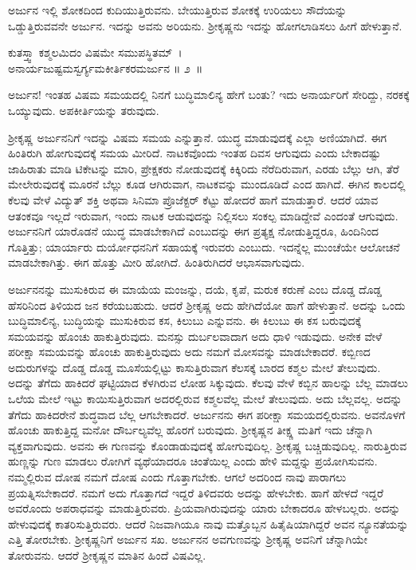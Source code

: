 ಅರ್ಜುನ ಇಲ್ಲಿ ಶೋಕದಿಂದ ಕುದಿಯುತ್ತಿರುವನು. ಬೇಯುತ್ತಿರುವ ಶೋಕಕ್ಕೆ ಉರಿಯಲು ಸೌದೆಯನ್ನು ಒಡ್ಡುತ್ತಿರುವವನೇ ಅರ್ಜುನ. ಇದನ್ನು ಅವನು ಅರಿಯನು. ಶ‍್ರೀಕೃಷ್ಣನು ಇದನ್ನು ಹೋಗಲಾಡಿಸಲು ಹೀಗೆ ಹೇಳುತ್ತಾನೆ.

\begin{shloka}
ಕುತಸ್ತ್ವಾ ಕಶ್ಮಲಮಿದಂ ವಿಷಮೇ ಸಮುಪಸ್ಥಿತಮ್~।\\ಅನಾರ್ಯಜುಷ್ಟಮಸ್ವರ್ಗ್ಯಮಕೀರ್ತಿಕರಮರ್ಜುನ \hfill॥ ೨~॥
\end{shloka}

\begin{artha}
ಅರ್ಜುನ! ಇಂತಹ ವಿಷಮ ಸಮಯದಲ್ಲಿ ನಿನಗೆ ಬುದ್ಧಿಮಾಲಿನ್ಯ ಹೇಗೆ ಬಂತು? ಇದು ಅನಾರ್ಯರಿಗೆ ಸೇರಿದ್ದು, ನರಕಕ್ಕೆ ಒಯ್ಯುವುದು. ಅಪಕೀರ್ತಿಯನ್ನು ತರುವುದು.
\end{artha}

ಶ‍್ರೀಕೃಷ್ಣ ಅರ್ಜುನನಿಗೆ ಇದನ್ನು ವಿಷಮ ಸಮಯ ಎನ್ನುತ್ತಾನೆ. ಯುದ್ಧ ಮಾಡುವುದಕ್ಕೆ ಎಲ್ಲಾ ಅಣಿಯಾಗಿದೆ. ಈಗ ಹಿಂತಿರುಗಿ ಹೋಗುವುದಕ್ಕೆ ಸಮಯ ಮೀರಿದೆ. ನಾಟಕವೊಂದು ಇಂತಹ ದಿವಸ ಆಗುವುದು ಎಂದು ಬೇಕಾದಷ್ಟು ಜಾಹಿರಾತು ಮಾಡಿ ಟಿಕೇಟನ್ನು ಮಾರಿ, ಪ್ರೇಕ್ಷಕರು ನೋಡುವುದಕ್ಕೆ ಕಿಕ್ಕಿರಿದು ನೆರೆದಿರುವಾಗ, ಎರಡು ಬೆಲ್ಲು ಆಗಿ, ತೆರೆ ಮೇಲೇರುವುದಕ್ಕೆ ಮೂರನೆ ಬೆಲ್ಲು ಕೂಡ ಆಗಿರುವಾಗ, ನಾಟಕವನ್ನು ಮುಂದೂಡಿದೆ ಎಂದ ಹಾಗಿದೆ. ಈಗಿನ ಕಾಲದಲ್ಲಿ ಕೆಲವು ವೇಳೆ ವಿದ್ಯುತ್ ಶಕ್ತಿ ಅಥವಾ ಸಿನಿಮಾ ಪ್ರೊಜೆಕ್ಟರ್ ಕೆಟ್ಟು ಹೋದರೆ ಹಾಗೆ ಮಾಡುತ್ತಾರೆ. ಆದರೆ ಯಾವ ಆತಂಕವೂ ಇಲ್ಲದೆ ಇರುವಾಗ, ಇಂದು ನಾಟಕ ಆಡುವುದನ್ನು ನಿಲ್ಲಿಸಲು ಸಂಕಲ್ಪ ಮಾಡಿದ್ದೇವೆ ಎಂದಂತೆ ಆಗುವುದು. ಅರ್ಜುನನಿಗೆ ಯಾರೊಡನೆ ಯುದ್ಧ ಮಾಡಬೇಕಾಗಿದೆ ಎಂಬುದನ್ನು ಈಗ ಪ್ರತ್ಯಕ್ಷ ನೋಡುತ್ತಿದ್ದರೂ, ಹಿಂದಿನಿಂದ ಗೊತ್ತಿತ್ತು; ಯಾರ್ಯಾರು ದುರ್ಯೋಧನನಿಗೆ ಸಹಾಯಕ್ಕೆ ಇರುವರು ಎಂಬುದು. ಇದನ್ನೆಲ್ಲ ಮುಂಚೆಯೇ ಆಲೋಚನೆ ಮಾಡಬೇಕಾಗಿತ್ತು. ಈಗ ಹೊತ್ತು ಮೀರಿ ಹೋಗಿದೆ. ಹಿಂತಿರುಗಿದರೆ ಆಭಾಸವಾಗುವುದು.

\newpage

ಅರ್ಜುನನನ್ನು ಮುಸುಕಿರುವ ಈ ಮಾಯೆಯ ಮಂಜನ್ನು, ದಯೆ, ಕೃಪೆ, ಮರುಕ ಕರುಣೆ ಎಂಬ ದೊಡ್ಡ ದೊಡ್ಡ ಹೆಸರಿನಿಂದ ತಿಳಿಯದ ಜನ ಕರೆಯಬಹುದು. ಆದರೆ ಶ‍್ರೀಕೃಷ್ಣ ಅದು ಹೇಗಿದೆಯೋ ಹಾಗೆ ಹೇಳುತ್ತಾನೆ. ಅದನ್ನು ಒಂದು ಬುದ್ಧಿಮಾಲಿನ್ಯ, ಬುದ್ಧಿಯನ್ನು ಮುಸುಕಿರುವ ಕಸ, ಕಿಲುಬು ಎನ್ನುವನು. ಈ ಕಿಲುಬು ಈ ಕಸ ಬರುವುದಕ್ಕೆ ಸಮಯವನ್ನು ಹೊಂಚು ಹಾಕುತ್ತಿರುವುದು. ಮನಸ್ಸು ದುರ್ಬಲವಾದಾಗ ಅದು ಧಾಳಿ ಇಡುವುದು. ಅನೇಕ ವೇಳೆ ಪರೀಕ್ಷಾ ಸಮಯವನ್ನು ಹೊಂಚು ಹಾಕುತ್ತಿರುವುದು ಅದು ನಮಗೆ ಮೋಸವನ್ನು ಮಾಡಬೇಕಾದರೆ. ಕಬ್ಬಿಣದ ಅದುರುಗಳನ್ನು ದೊಡ್ಡ ದೊಡ್ಡ ಮೂಸೆಯಲ್ಲಿಟ್ಟು ಕಾಸುತ್ತಿರುವಾಗ ಕೆಲಸಕ್ಕೆ ಬಾರದ ಕಶ್ಮಲ ಮೇಲೆ ತೇಲುವುದು. ಅದನ್ನು ತೆಗೆದು ಹಾಕಿದರೆ ಘಟ್ಟಿಯಾದ ಕೆಳಗಿರುವ ಲೋಹ ಸಿಕ್ಕುವುದು. ಕೆಲವು ವೇಳೆ ಕಬ್ಬಿನ ಹಾಲನ್ನು ಬೆಲ್ಲ ಮಾಡಲು ಒಲೆಯ ಮೇಲೆ ಇಟ್ಟು ಕಾಯಿಸುತ್ತಿರುವಾಗ ಅದರಲ್ಲಿರುವ ಕಶ್ಮಲವೆಲ್ಲ ಮೇಲೆ ತೇಲುವುದು. ಅದು ಬೆಲ್ಲವಲ್ಲ. ಅದನ್ನು ತೆಗೆದು ಹಾಕಿದರೇನೆ ಶುದ್ಧವಾದ ಬೆಲ್ಲ ಆಗಬೇಕಾದರೆ. ಅರ್ಜುನನು ಈಗ ಪರೀಕ್ಷಾ ಸಮಯದಲ್ಲಿರುವನು. ಅವನೊಳಗೆ ಹೊಂಚು ಹಾಕುತ್ತಿದ್ದ ಮನೋ ದೌರ್ಬಲ್ಯವೆಲ್ಲ ಹೊರಗೆ ಬರುವುದು. ಶ‍್ರೀಕೃಷ್ಣನ ತೀಕ್ಷ್ಣ ಮತಿಗೆ ಇದು ಚೆನ್ನಾಗಿ ವ್ಯಕ್ತವಾಗುವುದು. ಅವನು ಈ ಗುಣವನ್ನು ಕೊಂಡಾಡುವುದಕ್ಕೆ ಹೋಗುವುದಿಲ್ಲ. ಶ‍್ರೀಕೃಷ್ಣ ಬಚ್ಚಿಡುವುದಿಲ್ಲ. ನಾರುತ್ತಿರುವ ಹುಣ್ಣನ್ನು ಗುಣ ಮಾಡಲು ರೋಗಿಗೆ ವ್ಯಥೆಯಾದರೂ ಚಿಂತೆಯಿಲ್ಲ ಎಂದು ಹೇಳಿ ಮದ್ದನ್ನು ಪ್ರಯೋಗಿಸುವನು. ನಮ್ಮಲ್ಲಿರುವ ದೋಷ ನಮಗೆ ದೋಷ ಎಂದು ಗೊತ್ತಾಗಬೇಕು. ಆಗಲೆ ಅದರಿಂದ ನಾವು ಪಾರಾಗಲು ಪ್ರಯತ್ನಿಸಬೇಕಾದರೆ. ನಮಗೆ ಅದು ಗೊತ್ತಾಗದೆ ಇದ್ದರೆ ತಿಳಿದವರು ಅದನ್ನು ಹೇಳಬೇಕು. ಹಾಗೆ ಹೇಳದೆ ಇದ್ದರೆ ಅವರೊಂದು ಅಪರಾಧವನ್ನು ಮಾಡುತ್ತಿರುವರು. ಪ್ರಿಯವಾಗಿರುವುದನ್ನು ಯಾರು ಬೇಕಾದರೂ ಹೇಳಬಲ್ಲರು. ಅದನ್ನು ಹೇಳುವುದಕ್ಕೆ ಕಾತರಿಸುತ್ತಿರುವರು. ಆದರೆ ನಿಜವಾಗಿಯೂ ನಾವು ಮತ್ತೊಬ್ಬನ ಹಿತೈಷಿಯಾಗಿದ್ದರೆ ಅವನ ನ್ಯೂನತೆಯನ್ನು ಎತ್ತಿ ತೋರಬೇಕು. ಶ‍್ರೀಕೃಷ್ಣನಿಗೆ ಅರ್ಜುನ ಸಖ. ಅರ್ಜುನನ ಅವಗುಣವನ್ನು ಶ‍್ರೀಕೃಷ್ಣ ಅವನಿಗೆ ಚೆನ್ನಾಗಿಯೇ ತೋರುವನು. ಆದರೆ ಶ‍್ರೀಕೃಷ್ಣನ ಮಾತಿನ ಹಿಂದೆ ವಿಷವಿಲ್ಲ.

